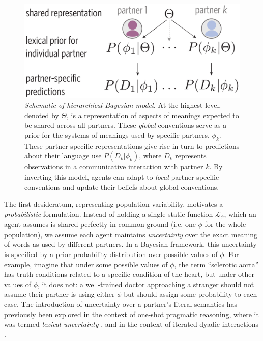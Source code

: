 \begin{figure}[t!]
\includegraphics[scale=0.4]{./figures/task1_model.pdf}
\vspace{.5em}
\caption{\emph{Schematic of hierarchical Bayesian model.} At the highest level, denoted by $\Theta$, is a representation of aspects of meanings expected to be shared across all partners. These \emph{global} conventions serve as a prior for the systems of meanings used by specific partners, $\phi_k$. These partner-specific representations give rise in turn to predictions about their language use $P(D_k|\phi_k)$, where $D_k$ represents observations in a communicative interaction with partner $k$. By inverting this model, agents can adapt to \emph{local} partner-specific conventions and update their beliefs about global conventions.}
\label{fig:model_schematic}
\end{figure}
The first desideratum, representing population variability, motivates a \emph{probabilistic} formulation.
Instead of holding a single static function $\mathcal{L}_{\phi}$, which an agent assumes is shared perfectly in common ground (i.e. one $\phi$ for the whole population), we assume each agent maintains \emph{uncertainty} over the exact meaning of words as used by different partners.
In a Bayesian framework, this uncertainty is specified by a prior probability distribution over possible values of $\phi$.
For example, imagine that under some possible values of $\phi$, the term ``sclerotic aorta'' has truth conditions related to a specific condition of the heart, but under other values of $\phi$, it does not: a well-trained doctor approaching a stranger should not assume their partner is using either $\phi$ but should assign some probability to each case.
The introduction of uncertainty over a partner's literal semantics has previously been explored in the context of one-shot pragmatic reasoning, where it was termed \emph{lexical uncertainty} \cite{bergen_pragmatic_2016}, and in the context of iterated dyadic interactions \cite{SmithGoodmanFrank13_RecursivePragmaticReasoningNIPS}. 


